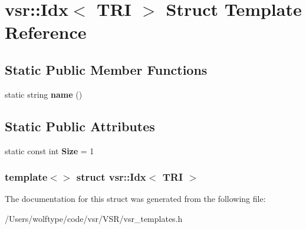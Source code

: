 \hypertarget{structvsr_1_1_idx_3_01_t_r_i_01_4}{\section{vsr\-:\-:Idx$<$ T\-R\-I $>$ Struct Template Reference}
\label{structvsr_1_1_idx_3_01_t_r_i_01_4}
}
\subsection*{Static Public Member Functions}
\begin{DoxyCompactItemize}
\item 
\hypertarget{structvsr_1_1_idx_3_01_t_r_i_01_4_aaf5279c69d213bbf4b78581f962bd892}{static string {\bfseries name} ()}\label{structvsr_1_1_idx_3_01_t_r_i_01_4_aaf5279c69d213bbf4b78581f962bd892}

\end{DoxyCompactItemize}
\subsection*{Static Public Attributes}
\begin{DoxyCompactItemize}
\item 
\hypertarget{structvsr_1_1_idx_3_01_t_r_i_01_4_aeaffc258c61fa057f9f12c29cf6cd827}{static const int {\bfseries Size} = 1}\label{structvsr_1_1_idx_3_01_t_r_i_01_4_aeaffc258c61fa057f9f12c29cf6cd827}

\end{DoxyCompactItemize}
\subsubsection*{template$<$$>$ struct vsr\-::\-Idx$<$ T\-R\-I $>$}



The documentation for this struct was generated from the following file\-:\begin{DoxyCompactItemize}
\item 
/\-Users/wolftype/code/vsr/\-V\-S\-R/vsr\-\_\-templates.\-h\end{DoxyCompactItemize}
